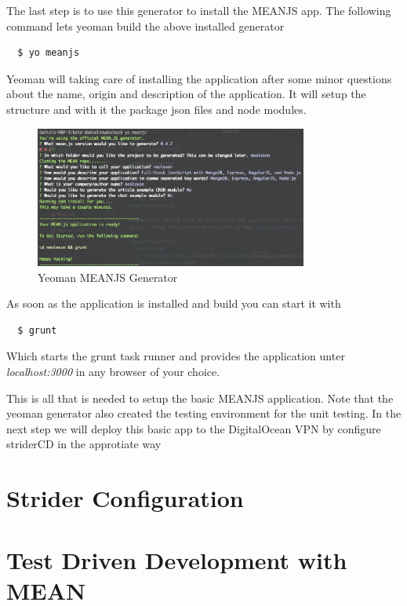 The last step is to use this generator to install the MEANJS app. The following command lets yeoman build the above installed generator

\begin{lstlisting}
  $ yo meanjs
\end{lstlisting}

Yeoman will taking care of installing the application after some minor questions about the name, origin and description of the application.
It will setup the structure and with it the package json files and node modules.

\begin{figure}[h!]
  \centering
      \includegraphics[width=0.8\textwidth]{images/yomean.png}
  \caption{Yeoman MEANJS Generator}
\end{figure}

As soon as the application is installed and build you can start it with

\begin{lstlisting}
  $ grunt
\end{lstlisting}

Which starts the grunt task runner and provides the application unter \textit{localhost:3000} in any browser of your choice.

This is all that is needed to setup the basic MEANJS application. Note that the yeoman generator also created the testing environment
for the unit testing. In the next step we will deploy this basic app to the DigitalOcean VPN by configure striderCD in the approtiate way

\section{Strider Configuration}
\label{section:Strider Configuration}


\section{Test Driven Development with MEAN}
\label{section:Test Driven Development with MEAN}

